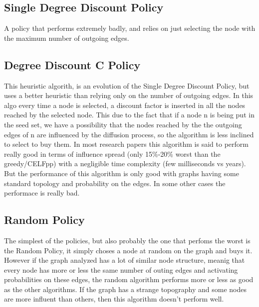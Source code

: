 \subsection{Single Degree Discount Policy}

A policy that performs extremely badly, and relies on just selecting the node with the maximum number of outgoing edges.

\subsection{Degree Discount C Policy}
This heuristic algorith, is an evolution of the Single Degree Discount Policy, but uses a better heuristic than relying only on the number of outgoing edges.
In this algo every time a node is selected, a discount factor is inserted in all the nodes reached by the selected node. This due to the fact that if a node n is being put in the seed set, we have a possibility that the nodes reached by the the outgoing edges of n are influenced by the diffusion process, so the algorithm is less inclined to select to buy them.
In most research papers this algorithm is said to perform really good in terms of influence spread (only 15\%-20\% worst than the greedy/CELFpp) with a negligible time complexity (few milliseconds vs years).
But the performance of this algorithm is only good with graphs having some standard topology and probability on the edges.
In some other cases the performace is really bad.


\subsection{Random Policy}

The simplest of the policies, but also probably the one that perfoms the worst is the Random Policy, it simply choses a node at random on the graph and buys it.
However if the graph analyzed has a lot of similar node structure, meanig that every node has more or less the same number of outing edges and activating probabilities on these edges, the random algorithm performs more or less as good as the other algorithms.
If the graph has a strange topography and some nodes are more influent than others, then this algorithm doesn't perform well.
